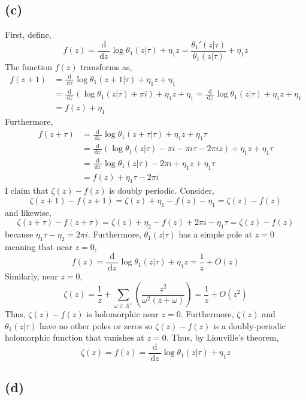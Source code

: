 \documentclass[12pt]{extarticle}
\renewcommand{\d}[1]{\: \mathrm{d}#1 \:}
\newcommand{\deriv}[2]{\frac{\d{#1}}{\d{#2}}}
\theoremstyle{definition}
\begin{document}
\subsection*{(c)}
First, define,
\[ f(z) = \deriv{}{z} \log{\theta_1(z | \tau)} + \eta_1 z = \frac{\theta_1'(z | \tau)}{\theta_1(z | \tau)} + \eta_1 z \]
The function $f(z)$ transforms as,
\begin{align*}
f(z + 1) & = \deriv{}{z} \log{\theta_1(z + 1 | \tau)} + \eta_1 z + \eta_1
\\
& = \deriv{}{z} \left( \log{\theta_1(z | \tau)} + \pi i \right) + \eta_1 z + \eta_1 = \deriv{}{z} \log{\theta_1(z | \tau)} + \eta_1 z + \eta_1 
\\
& = f(z) + \eta_1
\end{align*}
Furthermore,
\begin{align*}
f(z + \tau) & = \deriv{}{z} \log{\theta_1(z + \tau | \tau)} + \eta_1 z + \eta_1 \tau
\\
& = \deriv{}{z} \left( \log{\theta_1(z | \tau)} - \pi i - \pi i \tau - 2 \pi i z \right) + \eta_1 z + \eta_1 \tau
\\
&  = \deriv{}{z} \log{\theta_1(z | \tau)} - 2 \pi i + \eta_1 z + \eta_1 \tau
\\
& = f(z) + \eta_1 \tau - 2 \pi i 
\end{align*}
I claim that $\zeta(z) - f(z)$ is doubly periodic. Consider,
\[ \zeta(z + 1) - f(z + 1) = \zeta(z) + \eta_1 - f(z) - \eta_1 = \zeta(z) - f(z) \]
and likewise,
\[ \zeta(z + \tau) - f(z + \tau) = \zeta(z) + \eta_2 - f(z) + 2 \pi i - \eta_1 \tau = \zeta(z) - f(z) \]
because $\eta_1 \tau - \eta_2 = 2 \pi i$. 
Furthermore, $\theta_1(z | \tau)$ has a simple pole at $z = 0$ meaning that near $z = 0$,
\[ f(z) = \deriv{}{z} \log{\theta_1(z | \tau)} + \eta_1 z = \frac{1}{z} + O(z) \]
Similarly, near $z = 0$,
\[ \zeta(z) = \frac{1}{z} + \sum_{\omega \in \Lambda^\times} \left( \frac{z^2}{\omega^2(z + \omega)} \right) = \frac{1}{z} + O(z^2) \]
Thus, $\zeta(z) - f(z)$ is holomorphic near $z = 0$. Furthermore, $\zeta(z)$ and $\theta_1(z | \tau)$ have no other poles or zeros so $\zeta(z) - f(z)$ is a doubly-periodic holomorphic function that vanishes at $z = 0$. Thus, by Liouville's theorem,
\[ \zeta(z) = f(z) = \deriv{}{z} \log{\theta_1(z | \tau)} + \eta_1 z \]

\subsection*{(d)}
\end{document}

